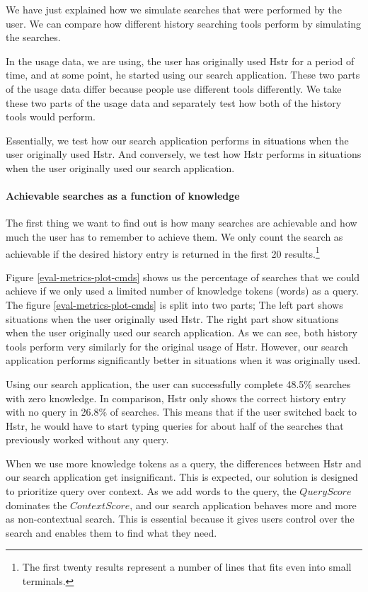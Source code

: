 We have just explained how we simulate searches that were performed by the user. We can compare how different history searching tools perform by simulating the searches. 

In the usage data, we are using, the user has originally used Hstr for a period of time, and at some point, he started using our search application. These two parts of the usage data differ because people use different tools differently. We take these two parts of the usage data and separately test how both of the history tools would perform. 

Essentially, we test how our search application performs in situations when the user originally used Hstr. And conversely, we test how Hstr performs in situations when the user originally used our search application.

\paragraph{Achievable searches as a function of knowledge}

The first thing we want to find out is how many searches are achievable and how much the user has to remember to achieve them. We only count the search as achievable if the desired history entry is returned in the first 20 results.\footnote{The first twenty results represent a number of lines that fits even into small terminals.} 

Figure \ref{eval-metrics-plot-cmds} shows us the percentage of searches that we could achieve if we only used a limited number of knowledge tokens (words) as a query. 
The figure \ref{eval-metrics-plot-cmds} is split into two parts; The left part shows situations when the user originally used Hstr. The right part show situations when the user originally used our search application. As we can see, both history tools perform very similarly for the original usage of Hstr. However, our search application performs significantly better in situations when it was originally used. 

Using our search application, the user can successfully complete 48.5\% searches with zero knowledge. In comparison, Hstr only shows the correct history entry with no query in 26.8\% of searches. 
This means that if the user switched back to Hstr, he would have to start typing queries for about half of the searches that previously worked without any query.

When we use more knowledge tokens as a query, the differences between Hstr and our search application get insignificant. This is expected, our solution is designed to prioritize query over context. As we add words to the query, the \(QueryScore\) dominates the \(ContextScore\), and our search application behaves more and more as non-contextual search. This is essential because it gives users control over the search and enables them to find what they need.


